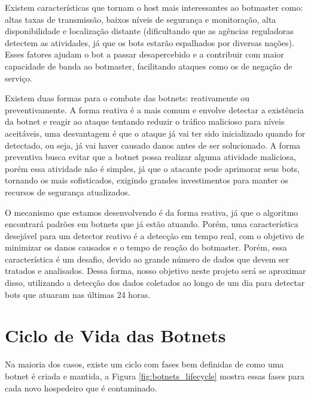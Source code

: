 Existem características que tornam o host mais interessantes ao botmaster como: altas taxas de transmissão, baixos níveis de segurança e monitoração, alta disponibilidade e localização distante (dificultando que as agências reguladoras detectem as atividades, já que os bots estarão espalhados por diversas nações). Esses fatores ajudam o bot a passar desapercebido e a contribuir com maior capacidade de banda ao botmaster, facilitando ataques como os de negação de serviço.

Existem duas formas para o combate das botnets: reativamente ou preventivamente. A forma reativa é a mais comum e envolve detectar a existência da botnet e reagir ao ataque tentando reduzir o tráfico malicioso para níveis aceitáveis, uma desvantagem é que o ataque já vai ter sido inicializado quando for detectado, ou seja, já vai haver causado danos antes de ser solucionado. A forma preventiva busca evitar que a botnet possa realizar alguma atividade maliciosa, porém essa atividade não é simples, já que o atacante pode aprimorar seus bots, tornando os mais sofisticados, exigindo grandes investimentos para manter os recursos de segurança atualizados.

O mecanismo que estamos desenvolvendo é da forma reativa, já que o algoritmo encontrará padrões em botnets que já estão atuando. Porém, uma característica desejável para um detector reativo é a detecção em tempo real, com o objetivo de minimizar os danos causados e o tempo de reação do botmaster. Porém, essa característica é um desafio, devido ao grande número de dados que devem ser tratados e analisados. Dessa forma, nosso objetivo neste projeto será se aproximar disso, utilizando a detecção dos dados coletados ao longo de um dia para detectar bots que atuaram nas últimas 24 horas.

\section{Ciclo de Vida das Botnets}
Na maioria dos casos, existe um ciclo com fases bem definidas de como uma botnet é criada e mantida, a Figura \ref{fig:botnets_lifecycle} mostra essas fases para cada novo hospedeiro que é contaminado.

